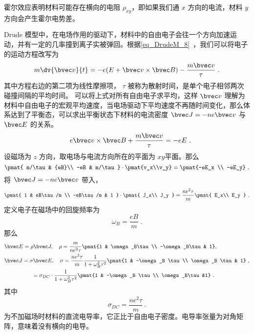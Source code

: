 霍尔效应表明材料可能存在横向的电阻 $\rho_{xy}$，即如果我们通 $x$ 方向的电流，材料 $y$ 方向会产生霍尔电势差。

Drude 模型中，在电场作用的驱动下，材料中的自由电子会往一个方向加速运动，并有一定的几率撞到离子实被弹回。根据\autoref{eq_DrudeM_8}~，我们可以将电子的运动方程改写为
\begin{equation}
m\dv{\bvec v}{t} =  -e(E+\bvec v\times \bvec B)-\frac{m\bvec v}{\tau} ~.
\end{equation}
其中方程右边的第二项为线性摩擦项， $\tau$ 被称为散射时间，是单个电子相邻两次碰撞间隔的平均时间。
可以将上式对所有自由电子求平均，这样 $\bvec v$ 理解为材料中自由电子的宏观平均速度，当电场驱动下平均速度不再随时间变化，那么体系达到了平衡态，可以求出平衡状态下材料的电流密度 $\bvec J=-ne\bvec v$ 与 $\bvec E$ 的关系。
\begin{equation}
\quad e\bvec v\times \bvec B + \frac{m\bvec v}{\tau} = -eE~.
\end{equation}
设磁场为 $z$ 方向，取电场与电流方向所在的平面为 $xy$平面。那么
\begin{equation}
\pmat{
m/\tau  & {eB}\\
-eB & m/\tau
} 
\cdot 
\pmat{v_x\\v_y}=\pmat{-eE_x \\ -eE_y}
~.
\end{equation}
将 $\bvec J=-ne\bvec v$ 带入，
\begin{equation}
\pmat{
    1 & eB\tau/m \\
    -eB\tau/m & 1
}
\cdot 
\pmat{
   J_x\\
   J_y 
}=
\frac{ne^2 \tau}{m }
\pmat{
    E_x\\
    E_y
}
~.
\end{equation}
定义电子在磁场中的回旋频率为
\begin{equation}
\omega_B=\frac{eB}{m}~.
\end{equation}
那么
\begin{equation}
\begin{aligned}
&\bvec E=\rho \bvec J,\quad \rho=\frac{m}{ne^2\tau} \pmat{1 & \omega_B\tau \\ -\omega_B\tau & 1},
\\
&\bvec J=\sigma \bvec E,\quad \sigma =\frac{ne^2\tau}{m} \frac{1}{1+\omega_B^2\tau^2}\pmat{1 & -\omega_B \tau \\ \omega_B \tau & 1} ~,\\
&\qquad \qquad\quad =\sigma_{DC} \cdot  \frac{1}{1+\omega_B^2\tau^2}\pmat{1 & -\omega_B \tau \\ \omega_B\tau &1} ~.
\end{aligned}
\end{equation}
其中
\begin{equation}
\sigma_{DC} = \frac{ne^2\tau}{m}~.
\end{equation}
为不加磁场时材料的直流电导率，它正比于自由电子密度。电导率张量为对角矩阵，意味着没有横向的电导。

